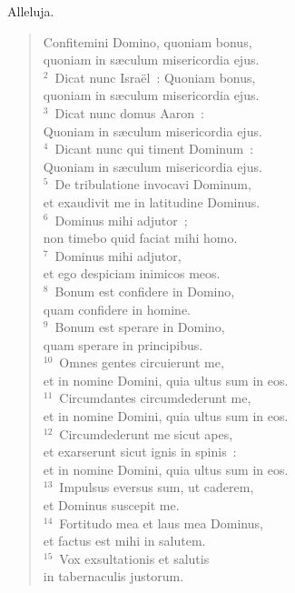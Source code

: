 \lettrine[lines=3,image=true,loversize=0.05,lraise=-0.03]{A}{}lleluja. \begin{flushleft}\begin{verse}\vspace{6pt}Confitemini Domino, quoniam bonus,\\ quoniam in s\ae culum misericordia ejus.\\
${}^{2}$~Dicat nunc Isra\"el~: Quoniam bonus,\\ quoniam in s\ae culum misericordia ejus.\\
${}^{3}$~Dicat nunc domus Aaron~:\\ Quoniam in s\ae culum misericordia ejus.\\
${}^{4}$~Dicant nunc qui timent Dominum~:\\ Quoniam in s\ae culum misericordia ejus.\\
${}^{5}$~De tribulatione invocavi Dominum,\\ et exaudivit me in latitudine Dominus.\\
${}^{6}$~Dominus mihi adjutor~;\\ non timebo quid faciat mihi homo.\\
${}^{7}$~Dominus mihi adjutor,\\ et ego despiciam inimicos meos.\\
${}^{8}$~Bonum est confidere in Domino,\\ quam confidere in homine.\\
${}^{9}$~Bonum est sperare in Domino,\\ quam sperare in principibus.\\
${}^{10}$~Omnes gentes circuierunt me,\\ et in nomine Domini, quia ultus sum in eos.\\
${}^{11}$~Circumdantes circumdederunt me,\\ et in nomine Domini, quia ultus sum in eos.\\
${}^{12}$~Circumdederunt me sicut apes,\\ et exarserunt sicut ignis in spinis~:\\ et in nomine Domini, quia ultus sum in eos.\\
${}^{13}$~Impulsus eversus sum, ut caderem,\\ et Dominus suscepit me.\\
${}^{14}$~Fortitudo mea et laus mea Dominus,\\ et factus est mihi in salutem.\\
${}^{15}$~Vox exsultationis et salutis\\ in tabernaculis justorum.\\

\end{verse}
\end{flushleft}
